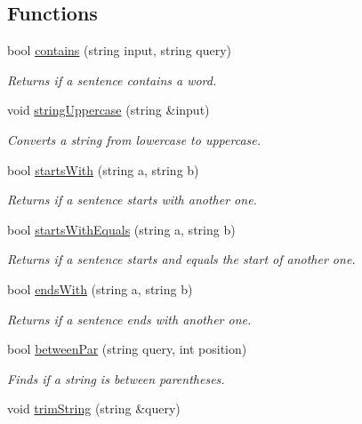 \subsection*{Functions}
\begin{DoxyCompactItemize}
\item 
bool \hyperlink{namespaceutils_a69c832543a093a8099189e4755695a62}{contains} (string input, string query)
\begin{DoxyCompactList}\small\item\em Returns if a sentence contains a word. \end{DoxyCompactList}\item 
void \hyperlink{namespaceutils_a4cc31521e740c9e31b4bfa8ee85eff46}{string\+Uppercase} (string \&input)
\begin{DoxyCompactList}\small\item\em Converts a string from lowercase to uppercase. \end{DoxyCompactList}\item 
bool \hyperlink{namespaceutils_ae840ea1b4ad4ce23c2b48158ac75d557}{starts\+With} (string a, string b)
\begin{DoxyCompactList}\small\item\em Returns if a sentence starts with another one. \end{DoxyCompactList}\item 
bool \hyperlink{namespaceutils_ac8cc8683906877c69cfea7cb2812ed07}{starts\+With\+Equals} (string a, string b)
\begin{DoxyCompactList}\small\item\em Returns if a sentence starts and equals the start of another one. \end{DoxyCompactList}\item 
bool \hyperlink{namespaceutils_a57772e91d08481b38c47cda04479e169}{ends\+With} (string a, string b)
\begin{DoxyCompactList}\small\item\em Returns if a sentence ends with another one. \end{DoxyCompactList}\item 
bool \hyperlink{namespaceutils_a1e1de2e5772bffdfe2c8d3309a61ddab}{between\+Par} (string query, int position)
\begin{DoxyCompactList}\small\item\em Finds if a string is between parentheses. \end{DoxyCompactList}\item 
void \hyperlink{namespaceutils_a9f184d101ac739ab058355ab5413ca9a}{trim\+String} (string \&query)

\end{DoxyCompactItemize}

